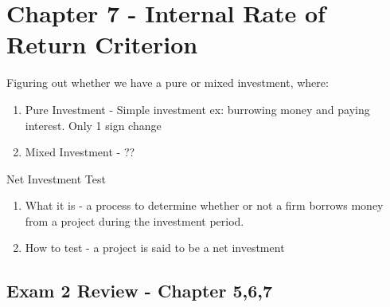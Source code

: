 \documentclass{report} %
\begin{document}
\section*{Chapter 7 - Internal Rate of Return Criterion}
Figuring out whether we have a pure or mixed investment, where:
\begin{enumerate}
    \item Pure Investment - Simple investment ex: burrowing money and paying interest. Only 1 sign change
    \item Mixed Investment - ??
\end{enumerate}
Net Investment Test
\begin{enumerate}
    \item What it is - a process to determine whether or not a firm borrows money from a project during the investment period.
    \item How to test - a project is said to be a net investment
\end{enumerate}

\subsection*{Exam 2 Review - Chapter 5,6,7}
\end{document}
